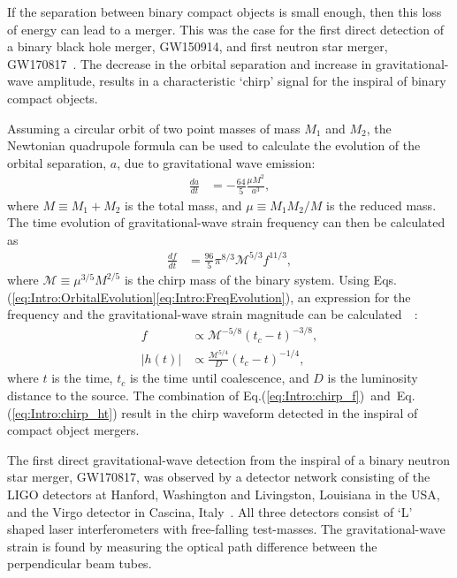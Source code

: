 \documentclass[../Thesis.tex]{subfiles}
\begin{document}
    If the separation between binary compact objects is small enough, then this loss of energy can lead to a merger.
    This was the case for the first direct detection of a binary black hole merger, GW150914, and first neutron star merger, GW170817~\cite{GW150914Detection,GW170817Detection}. 
    The decrease in the orbital separation and increase in gravitational-wave amplitude, results in a characteristic `chirp' signal for the inspiral of binary compact objects.
    
    Assuming a circular orbit of two point masses of mass $M_1$ and $M_2$, the Newtonian quadrupole formula can be used to calculate the evolution of the orbital separation, $a$, due to gravitational wave emission:~\cite[e.g.,][]{Cutler1994}
    \begin{align}
        \frac{da}{dt} & = -\frac{64}{5}\frac{\mu M^2}{a^3}, \label{eq:Intro:OrbitalEvolution}        
    \end{align}
    where  $M \equiv M_1 + M_2$ is the total mass, and $\mu \equiv M_1 M_2 / M$ is the reduced mass.
    The time evolution of gravitational-wave strain frequency can then be calculated as
    \begin{align}
        \frac{df}{dt} & = \frac{96}{5}\pi^{8/3}\mathcal{M}^{5/3}f^{11/3}, \label{eq:Intro:FreqEvolution}        
    \end{align}   
    where $\mathcal{M} \equiv \mu^{3/5} M^{2/5}$ is the chirp mass of the binary system. 
    Using Eqs.(\ref{eq:Intro:OrbitalEvolution}\Hyphdash*\ref{eq:Intro:FreqEvolution}), an expression for the frequency and the gravitational-wave strain magnitude can be calculated~~\cite[e.g.,][]{Cutler1994}: 
      \begin{align}
      f &  \propto \mathcal{M}^{- 5/8}(t_c-t)^{- 3/8},\label{eq:Intro:chirp_f}\\
        |h(t)| & \propto  \frac{\mathcal{M}^{5/4}}{D}(t_c-t)^{-1/4}, \label{eq:Intro:chirp_ht} 
    \end{align}
    where $t$ is the time, $t_c$ is the time until coalescence, and $D$ is the luminosity distance to the source. 
    The combination of Eq.(\ref{eq:Intro:chirp_f})~and~Eq.(\ref{eq:Intro:chirp_ht}) result in the chirp waveform detected in the inspiral of compact object mergers.
    \par
    The first direct gravitational-wave detection from the inspiral of a binary neutron star merger, GW170817, was observed by a detector network consisting of the LIGO detectors at Hanford, Washington and Livingston, Louisiana in the USA, and the Virgo detector in Cascina, Italy~\cite{AdvancedLIGO2015,AdvancedVirgo2015,GW170817Detection}. 
    All three detectors consist of `L' shaped laser interferometers with free-falling test-masses.
    The gravitational-wave strain is found by measuring the optical path difference between the perpendicular beam tubes. \par
    
\end{document}
